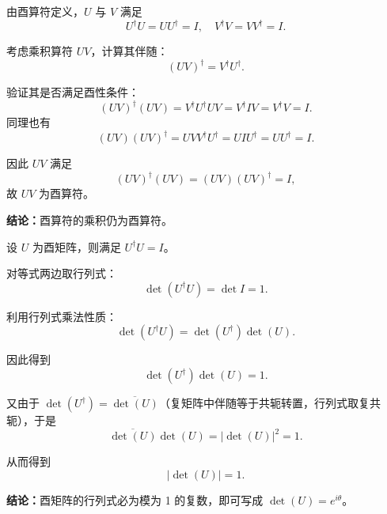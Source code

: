 \begin{solution}[酉算符乘积仍为酉算符]

\answer
由酉算符定义，$U$ 与 $V$ 满足
\[
U^\dagger U = UU^\dagger = I,\quad V^\dagger V = VV^\dagger = I.
\]

考虑乘积算符 $UV$，计算其伴随：
\[
(UV)^\dagger = V^\dagger U^\dagger.
\]

验证其是否满足酉性条件：
\[
(UV)^\dagger (UV) = V^\dagger U^\dagger U V = V^\dagger I V = V^\dagger V = I.
\]
同理也有
\[
(UV)(UV)^\dagger = U V V^\dagger U^\dagger = U I U^\dagger = U U^\dagger = I.
\]

因此 $UV$ 满足
\[
(UV)^\dagger (UV) = (UV)(UV)^\dagger = I,
\]
故 $UV$ 为酉算符。

\textbf{结论：}酉算符的乘积仍为酉算符。
\end{solution}


\begin{solution}[行列式与酉矩阵的性质]

\answer
设 $U$ 为酉矩阵，则满足 $U^\dagger U=I$。

对等式两边取行列式：
\[
\det(U^\dagger U)=\det I=1.
\]

利用行列式乘法性质：
\[
\det(U^\dagger U)=\det(U^\dagger)\det(U).
\]

因此得到
\[
\det(U^\dagger)\det(U)=1.
\]

又由于 $\det(U^\dagger)=\overline{\det(U)}$（复矩阵中伴随等于共轭转置，行列式取复共轭），于是
\[
\overline{\det(U)}\det(U)=|\det(U)|^2=1.
\]

从而得到
\[
|\det(U)|=1.
\]

\textbf{结论：}酉矩阵的行列式必为模为 1 的复数，即可写成 $\det(U)=e^{i\theta}$。
\end{solution}


